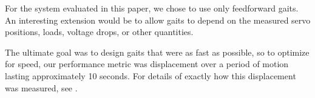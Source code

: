 For the system evaluated in this paper, we chose to use only
feedforward gaits.  An interesting extension would be to allow gaits
to depend on the measured servo positions, loads, voltage drops, or
other quantities.

The ultimate goal was to design gaits that were as fast as possible,
so to optimize for speed, our performance metric was displacement over
a period of motion lasting approximately 10 seconds.  For details of
exactly how this displacement was measured, see .
